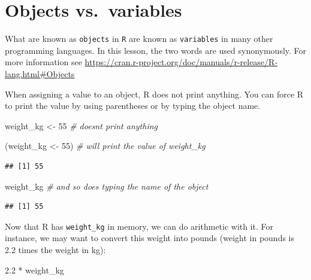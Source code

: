\documentclass[
]{book}
\newenvironment{Shaded}{\begin{snugshade}}{\end{snugshade}}
\newcommand{\CommentTok}[1]{\textcolor[rgb]{0.56,0.35,0.01}{\textit{#1}}}
\newcommand{\DecValTok}[1]{\textcolor[rgb]{0.00,0.00,0.81}{#1}}
\newcommand{\FloatTok}[1]{\textcolor[rgb]{0.00,0.00,0.81}{#1}}
\newcommand{\NormalTok}[1]{#1}
\newcommand{\OtherTok}[1]{\textcolor[rgb]{0.56,0.35,0.01}{#1}}
\newcommand{\SpecialCharTok}[1]{\textcolor[rgb]{0.00,0.00,0.00}{#1}}
\begin{document}
\hypertarget{objects-vs.-variables}{%
\section{Objects vs.~variables}\label{objects-vs.-variables}}

What are known as \texttt{objects} in \texttt{R} are known as \texttt{variables} in many other programming languages. In this lesson, the two words are used synonymously. For more information see \url{https://cran.r-project.org/doc/manuals/r-release/R-lang.html\#Objects}

When assigning a value to an object, R does not print anything. You can force R to print the value by using parentheses or by typing the object name.

\begin{Shaded}
\begin{Highlighting}[]
\NormalTok{weight\_kg }\OtherTok{\textless{}{-}} \DecValTok{55} \CommentTok{\#  doesn\textquotesingle{}t print anything}
\end{Highlighting}
\end{Shaded}

\begin{Shaded}
\begin{Highlighting}[]
\NormalTok{(weight\_kg }\OtherTok{\textless{}{-}} \DecValTok{55}\NormalTok{) }\CommentTok{\#  will print the value of \textasciigrave{}weight\_kg\textasciigrave{}}
\end{Highlighting}
\end{Shaded}

\begin{verbatim}
## [1] 55
\end{verbatim}

\begin{Shaded}
\begin{Highlighting}[]
\NormalTok{weight\_kg         }\CommentTok{\#  and so does typing the name of the object}
\end{Highlighting}
\end{Shaded}

\begin{verbatim}
## [1] 55
\end{verbatim}

Now that R has \texttt{weight\_kg} in memory, we can do arithmetic with it. For instance, we may want to convert this weight into pounds (weight in pounds is 2.2 times the weight in kg):

\begin{Shaded}
\begin{Highlighting}[]
\FloatTok{2.2} \SpecialCharTok{*}\NormalTok{ weight\_kg}
\end{Highlighting}
\end{Shaded}
\end{document}
